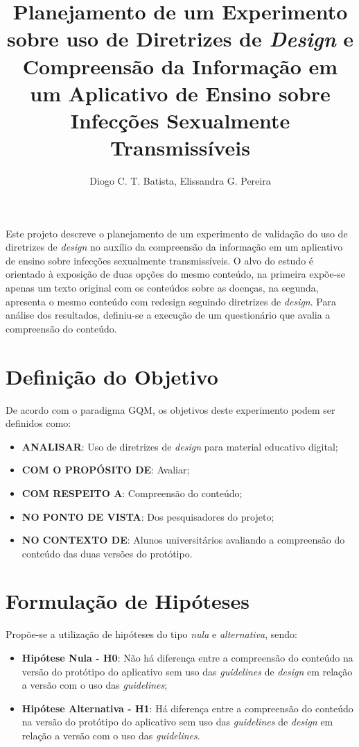 \documentclass[12pt]{article}
\title{Planejamento de um Experimento sobre uso de Diretrizes de \textit{Design} e Compreensão da Informação em um Aplicativo de Ensino sobre Infecções Sexualmente Transmissíveis}
\author{Diogo C. T. Batista\inst{1}, Elissandra G. Pereira\inst{1}}
\begin{document}
\maketitle

\begin{resumo}
	Este projeto descreve o planejamento de um experimento de validação do uso de diretrizes de \textit{design} no auxílio da compreensão da informação em um aplicativo de ensino sobre infecções sexualmente transmissíveis. O alvo do estudo é orientado à exposição de duas opções do mesmo conteúdo, na primeira expõe-se apenas um texto original com os conteúdos sobre as doenças, na segunda, apresenta o mesmo conteúdo com redesign seguindo diretrizes de \textit{design}. Para análise dos resultados, definiu-se a execução de um questionário que avalia a compreensão do conteúdo.
\end{resumo}

\section{Definição do Objetivo}

De acordo com o paradigma GQM, os objetivos deste experimento podem ser definidos como:

\begin{itemize}
	\item \textbf{ANALISAR}: Uso de diretrizes de \textit{design} para material educativo digital;
	\item \textbf{COM O PROPÓSITO DE}: Avaliar;
	\item \textbf{COM RESPEITO A}: Compreensão do conteúdo;
	\item \textbf{NO PONTO DE VISTA}: Dos pesquisadores do projeto;
	\item \textbf{NO CONTEXTO DE}: Alunos universitários avaliando a compreensão do conteúdo das duas versões do protótipo.
\end{itemize}

\section{Formulação de Hipóteses}

Propõe-se a utilização de hipóteses do tipo \textit{nula} e \textit{alternativa}, sendo:

\begin{itemize}
	\item \textbf{Hipótese Nula - H0}: Não há diferença entre a compreensão do conteúdo na versão do protótipo do aplicativo sem uso das \textit{guidelines} de \textit{design} em relação a versão com o uso das \textit{guidelines};
	\item \textbf{Hipótese Alternativa - H1}: Há diferença entre a compreensão do conteúdo na versão do protótipo do aplicativo sem uso das \textit{guidelines} de \textit{design} em relação a versão com o uso das \textit{guidelines}.
\end{itemize}
\end{document}
